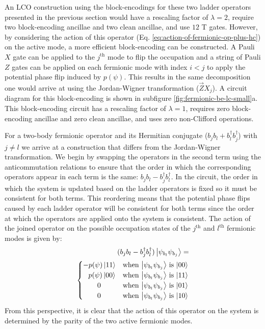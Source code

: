An LCO construction using the block-encodings for these two ladder operators presented in the previous section would have a rescaling factor of $\lambda = 2$, require two block-encoding ancillae and two clean ancillae, and use $12$ T gates.
However, by considering the action of this operator (Eq. \ref{eq:action-of-fermionic-op-plus-hc}) on the active mode, a more efficient block-encoding can be constructed.
A Pauli $X$ gate can be applied to the $j^\text{th}$ mode to flip the occupation and a string of Pauli $Z$ gates can be applied on each fermionic mode with index $i < j$ to apply the potential phase flip induced by $p(\psi)$.
This results in the same decomposition one would arrive at using the Jordan-Wigner transformation ($\vec{Z}X_j$).
A circuit diagram for this block-encoding is shown in subfigure \ref{fig:fermionic-be-lc-small}a.
This block-encoding circuit has a rescaling factor of $\lambda = 1$, requires zero block-encoding ancillae and zero clean ancillae, and uses zero non-Clifford operations.

For a two-body fermionic operator and its Hermitian conjugate ($b_j b_l + b_l^\dagger b_j^\dagger$) with $j \neq l$ we arrive at a construction that differs from the Jordan-Wigner transformation.
We begin by swapping the operators in the second term using the anticommutation relations to ensure that the order in which the corresponding operators appear in each term is the same: $b_j b_l - b_j^\dagger b_l^\dagger$.
In the circuit, the order in which the system is updated based on the ladder operators is fixed so it must be consistent for both terms.
This reordering means that the potential phase flips caused by each ladder operator will be consistent for both terms since the order at which the operators are applied onto the system is consistent.
The action of the joined operator on the possible occupation states of the $j^\text{th}$ and $l^\text{th}$ fermionic modes is given by:
\begin{equation}
    \begin{split}
        (b_j b_l - b_j^\dagger b_l^\dagger) \ket{\psi_{b_l} \psi_{b_j}} = \\
        \begin{cases} 
            - p(\psi) \ket{11} & \text{when $\ket{\psi_{b_l} \psi_{b_j}}$ is $\ket{00}$} \\
            \hspace{0.75em} p(\psi) \ket{00} & \text{when $\ket{\psi_{b_l} \psi_{b_j}}$ is $\ket{11}$} \\
            \hspace{2em} 0 & \text{when $\ket{\psi_{b_l} \psi_{b_j}}$ is $\ket{01}$} \\
            \hspace{2em} 0 & \text{when $\ket{\psi_{b_l} \psi_{b_j}}$ is $\ket{10}$} \\
        \end{cases}
    \end{split}
\end{equation}
From this perspective, it is clear that the action of this operator on the system is determined by the parity of the two active fermionic modes.

